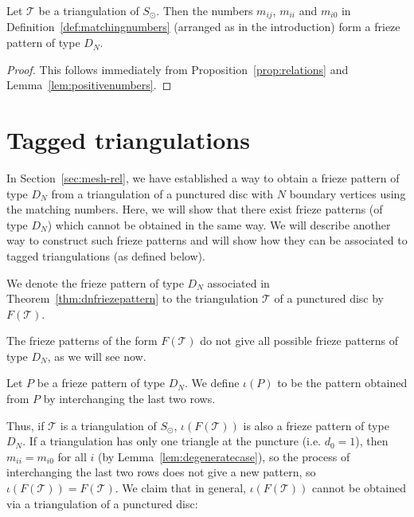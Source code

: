 \documentclass[a4paper]{amsart}
\begin{document}
\begin{theorem} \label{thm:dnfriezepattern}
Let ${\mathcal T}$ be a triangulation of $S_{\odot}$.
Then the numbers $m_{ij}$, $m_{ii}$ and $m_{i0}$ in
Definition~\ref{def:matchingnumbers} (arranged as in the introduction)
form a frieze pattern of type $D_N$.
\end{theorem}

\begin{proof}
This follows immediately from Proposition~\ref{prop:relations} and
Lemma~\ref{lem:positivenumbers}.
\end{proof}

\section{Tagged triangulations}
\label{sec:tagged}

In Section~\ref{sec:mesh-rel}, we have established a way to 
obtain a frieze pattern of type $D_N$ from a triangulation 
of a punctured disc with $N$ boundary vertices 
using the matching numbers. Here, we will show that there 
exist frieze patterns (of type $D_N$) which cannot be obtained 
in the same way. We will describe another way to construct 
such frieze patterns and will show how they can be associated 
to tagged triangulations (as defined below). 

\begin{definition}\label{def:pattern}
We denote the frieze pattern of type $D_N$ associated 
in Theorem~\ref{thm:dnfriezepattern}
to the triangulation ${\mathcal T}$ of a punctured disc by $F({\mathcal T})$. 
\end{definition}

The frieze patterns of the form $F({\mathcal T})$ do not give 
all possible frieze patterns of type $D_N$, as we will see now. 

\begin{definition}\label{def:switching}
Let $P$ be a frieze pattern of type $D_N$. We define $\iota(P)$ 
to be the pattern obtained from $P$ by interchanging the last 
two rows. 
\end{definition}

Thus, if ${\mathcal T}$ is a triangulation of $S_{\odot}$, $\iota(F({\mathcal T}))$ is 
also a frieze pattern of type $D_N$. 
If a triangulation has only one triangle 
at the puncture (i.e. $d_0=1$), then $m_{ii}=m_{i0}$ for all 
$i$ (by Lemma~\ref{lem:degeneratecase}), 
so the process of interchanging the last two rows does not 
give a new pattern, so $\iota (F({\mathcal T}))=F({\mathcal T})$. 
We claim that in general, $\iota (F({\mathcal T}))$ cannot be obtained 
via a triangulation of a punctured disc: 
\end{document}
